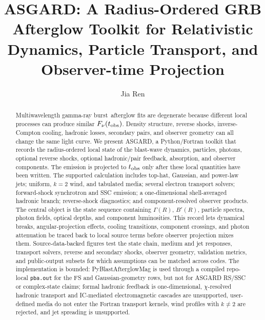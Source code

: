 \documentclass[twocolumn]{aastex702}
\newcommand{\asgard}{\textsc{ASGARD}}
\newcommand{\grb}{gamma-ray burst}
\begin{document}
\title{\asgard: A Radius-Ordered GRB Afterglow Toolkit for Relativistic Dynamics, Particle Transport, and Observer-time Projection}

\author[0000-0000-0000-0000]{Jia Ren}

\begin{abstract}
Multiwavelength \grb\ afterglow fits are degenerate because different local
processes can produce similar \(F_\nu(t_{\rm obs})\).  Density structure,
reverse shocks, inverse-Compton cooling, hadronic losses, secondary pairs, and
observer geometry can all change the same light curve.  We present \asgard, a
Python/Fortran toolkit that records the radius-ordered local state of the
blast-wave dynamics, particles, photons, optional reverse shocks, optional
hadronic/pair feedback, absorption, and observer components.  The emission is
projected to \(t_{\rm obs}\) only after these local quantities have been written.
The supported calculation includes top-hat, Gaussian, and power-law jets;
uniform, \(k=2\) wind, and tabulated media; several electron transport solvers;
forward-shock synchrotron and SSC emission; a one-dimensional shell-averaged
hadronic branch; reverse-shock diagnostics; and component-resolved observer
products.  The central object is the state sequence containing \(\Gamma(R)\),
\(B'(R)\), particle spectra, photon fields, optical depths, and component
luminosities.  This record lets dynamical breaks, angular-projection effects,
cooling transitions, component crossings, and photon attenuation be traced back
to local source terms before observer projection mixes them.  Source-data-backed
figures test the state chain, medium and jet responses, transport solvers,
reverse and secondary shocks, observer geometry, validation metrics, and
public-output subsets for which assumptions can be matched across codes.  The
implementation is bounded: PyBlastAfterglowMag is used through a
compiled repo-local \texttt{pba.out} for the FS and Gaussian-geometry rows, but
not for ASGARD RS/SSC or complex-state claims; formal hadronic feedback is
one-dimensional, \(\chi\)-resolved hadronic transport and IC-mediated
electromagnetic cascades are unsupported, user-defined media do not enter the
Fortran transport kernels, wind profiles with \(k\ne2\) are rejected, and jet
spreading is unsupported.
\end{abstract}

\end{document}
